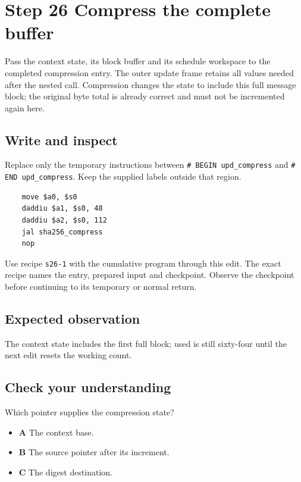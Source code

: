 \section{Step 26 Compress the complete buffer}\label{sha-s26}

Pass the context state, its block buffer and its schedule workspace to the completed compression entry. The outer update frame retains all values needed after the nested call. Compression changes the state to include this full message block; the original byte total is already correct and must not be incremented again here.

\subsection{Write and inspect}
Replace only the temporary instructions between \texttt{\# BEGIN upd\_compress} and \texttt{\# END upd\_compress}. Keep the supplied labels outside that region.

\begin{verbatim}
    move $a0, $s0
    daddiu $a1, $s0, 48
    daddiu $a2, $s0, 112
    jal sha256_compress
    nop
\end{verbatim}

Use recipe \texttt{s26-1} with the cumulative program through this edit. The exact recipe names the entry, prepared input and checkpoint. Observe the checkpoint before continuing to its temporary or normal return.

\subsection{Expected observation}
The context state includes the first full block; used is still sixty-four until the next edit resets the working count.

\subsection{Check your understanding}
Which pointer supplies the compression state?

\begin{itemize}
  \item \textbf{A} The context base.
  \item \textbf{B} The source pointer after its increment.
  \item \textbf{C} The digest destination.
\end{itemize}
